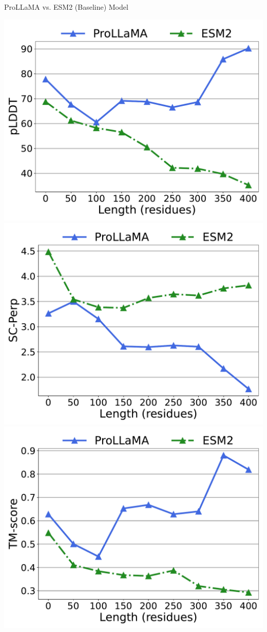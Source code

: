 \documentclass[dvipsnames,
hyperref={colorlinks,citecolor=black}
]{beamer}
\begin{document}
\begin{frame}{ProLLaMA vs. ESM2 (Baseline) Model}
	\begin{center}
		\includegraphics[scale=0.23]{images/combined_length_plddt_zhexiantu.pdf}
		\includegraphics[scale=0.23]{images/combined_length_scperp_zhexiantu.pdf}
		\includegraphics[scale=0.23]{images/combined_length_alntmscore_zhexiantu.pdf}

\end{center}
\end{frame}
\end{document}

